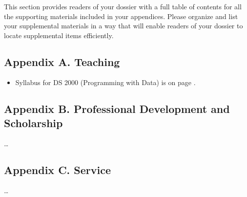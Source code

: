 This section provides readers of your dossier with a full table of contents for all the supporting materials included in your appendices. 
Please organize and list your supplemental materials in a way that will enable readers of your dossier to locate supplemental items efficiently.

\subsection*{Appendix A. Teaching}
\begin{itemize}
    \item Syllabus for DS 2000 (Programming with Data) is on page \pageref{syllabus-ds2000}.
\end{itemize}

\subsection*{Appendix B. Professional Development and Scholarship}
\ldots

\subsection*{Appendix C. Service}
\ldots
